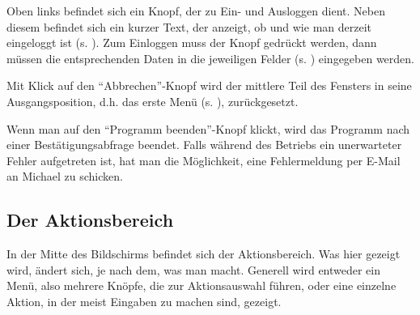 Oben links befindet sich ein Knopf, der zu Ein- und Ausloggen dient.
Neben diesem befindet sich ein kurzer Text, der anzeigt, ob und wie man derzeit eingeloggt ist (s. ). 
Zum Einloggen muss der Knopf gedrückt werden, dann müssen die entsprechenden Daten in die jeweiligen Felder (s. ) eingegeben werden.

Mit Klick auf den ``Abbrechen''-Knopf wird der mittlere Teil des Fensters in seine Ausgangsposition, d.h. das erste Menü (s. ), zurückgesetzt.

Wenn man auf den ``Programm beenden''-Knopf klickt, wird das Programm nach einer Bestätigungsabfrage beendet. Falls während des Betriebs ein unerwarteter Fehler aufgetreten ist, hat man die Möglichkeit, eine Fehlermeldung per E-Mail an Michael zu schicken.

\subsection{Der Aktionsbereich}
\label{subsec:interface:action_center}
In der Mitte des Bildschirms befindet sich der Aktionsbereich. Was hier gezeigt wird, ändert sich, je nach dem, was man macht.
Generell wird entweder ein Menü, also mehrere Knöpfe, die zur Aktionsauswahl führen, oder eine einzelne Aktion, in der meist Eingaben zu machen sind, gezeigt.

